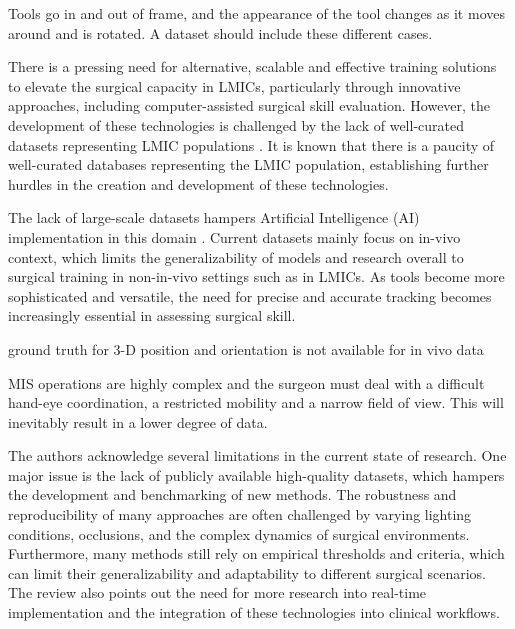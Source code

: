 Tools go in and out of frame, and the appearance of the tool changes as it moves around and is rotated. A dataset should include these different cases.

There is a pressing need for alternative, scalable and effective training solutions to elevate the surgical capacity in LMICs, particularly through innovative approaches, including computer-assisted surgical skill evaluation. However, the development of these technologies is challenged by the lack of well-curated datasets representing LMIC populations \cite{maier-hein_surgical_2022}. It is known that there is a paucity of well-curated databases \cite{organization_health_2016} representing the LMIC population, establishing further hurdles in the creation and development of these technologies. 

The lack of large-scale datasets hampers Artificial Intelligence (AI) implementation in this domain \cite{nwoye_cholectrack20_2023}. Current datasets mainly focus on in-vivo context, which limits the generalizability of models and research overall to surgical training in non-in-vivo settings such as in LMICs. As tools become more sophisticated and versatile, the need for precise and accurate tracking becomes increasingly essential in assessing surgical skill.

ground truth for 3-D position and orientation is not available for in vivo data 

MIS operations are highly complex and the surgeon must deal with a difficult hand-eye coordination, a restricted mobility and a narrow field of view. This will inevitably result in a lower degree of data.

The authors acknowledge several limitations in the current state of research. One major issue is the lack of publicly available high-quality datasets, which hampers the development and benchmarking of new methods. The robustness and reproducibility of many approaches are often challenged by varying lighting conditions, occlusions, and the complex dynamics of surgical environments. Furthermore, many methods still rely on empirical thresholds and criteria, which can limit their generalizability and adaptability to different surgical scenarios. The review also points out the need for more research into real-time implementation and the integration of these technologies into clinical workflows. 


